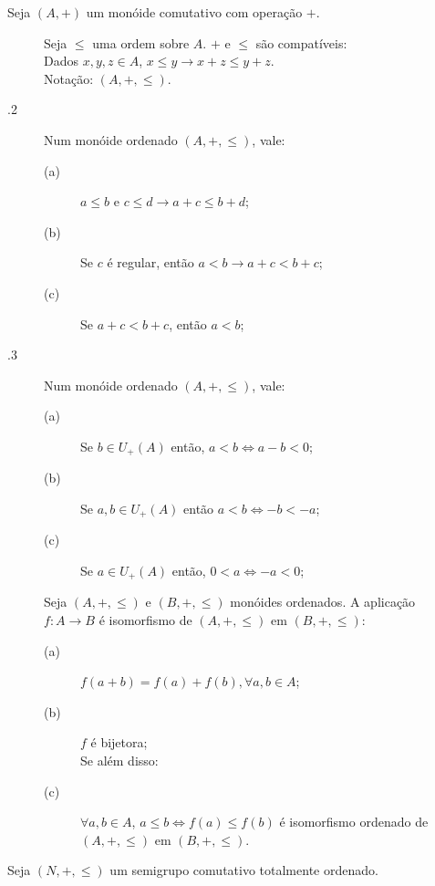 \documentclass[11pt]{article}
\begin{document}

Seja $(A, +)$ um monóide comutativo com operação $+$.

\begin{description}
  \item[] Seja $\leq$ uma ordem sobre $A$. $+$ e $\leq$ são compatíveis:
    \\
    Dados $x,y,z \in A$, $x \leq y \to x+z \leq y+z$. \\
    Notação: $(A, +, \leq)$.
  \item[.2] Num monóide ordenado $(A, +, \leq)$, vale:
  \begin{description}
    \item[(a)] $a \leq b$ e $c \leq d \to a+c \leq b+d$;
    \item[(b)] Se $c$ é regular, então $a < b \to a+c<b+c$;
    \item[(c)] Se $a+c<b+c$, então $a<b$;
  \end{description}
\item[.3] Num monóide ordenado $(A, +, \leq)$, vale:
  \begin{description}
    \item[(a)] Se $b\in U_+ (A)$ então, $a<b \iff a-b < 0$;
    \item[(b)] Se $a,b \in U_+ (A)$ então $a<b \iff -b< -a$;
    \item[(c)] Se $a \in U_+ (A)$ então, $0<a \iff -a <0$;
  \end{description}
\item[] Seja $(A, +, \leq)$ e $(B, +, \leq)$ monóides ordenados. A
  aplicação $f: A \to B$ é isomorfismo de $(A, +, \leq)$ em $(B, +, \leq)$:
  \begin{description}
    \item[(a)] $f(a+b) = f(a) + f(b), \forall a,b \in A$;
    \item[(b)] $f$ é bijetora; \\
      Se além disso:
    \item[(c)] $\forall a,b \in A$, $a \leq b \iff f(a) \leq f(b)$ é
      isomorfismo ordenado de $(A, +, \leq)$ em $(B, +, \leq)$.
  \end{description}
\end{description}


Seja $(N, +, \leq)$ um semigrupo comutativo totalmente ordenado.
\end{document}
